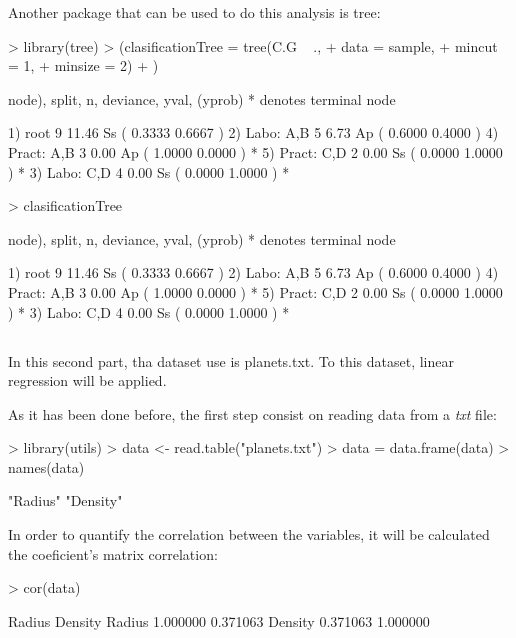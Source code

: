 \documentclass[a4paper]{article}
\begin{document}
Another package that can be used to do this analysis is tree:
\begin{Schunk}
\begin{Sinput}
> library(tree)
> (clasificationTree = tree(C.G ~ .,
+                           data = sample,
+                           mincut = 1,
+                           minsize = 2)
+ )
\end{Sinput}
\begin{Soutput}
node), split, n, deviance, yval, (yprob)
      * denotes terminal node

1) root 9 11.46 Ss ( 0.3333 0.6667 )  
  2) Labo: A,B 5  6.73 Ap ( 0.6000 0.4000 )  
    4) Pract: A,B 3  0.00 Ap ( 1.0000 0.0000 ) *
    5) Pract: C,D 2  0.00 Ss ( 0.0000 1.0000 ) *
  3) Labo: C,D 4  0.00 Ss ( 0.0000 1.0000 ) *
\end{Soutput}
\begin{Sinput}
> clasificationTree
\end{Sinput}
\begin{Soutput}
node), split, n, deviance, yval, (yprob)
      * denotes terminal node

1) root 9 11.46 Ss ( 0.3333 0.6667 )  
  2) Labo: A,B 5  6.73 Ap ( 0.6000 0.4000 )  
    4) Pract: A,B 3  0.00 Ap ( 1.0000 0.0000 ) *
    5) Pract: C,D 2  0.00 Ss ( 0.0000 1.0000 ) *
  3) Labo: C,D 4  0.00 Ss ( 0.0000 1.0000 ) *
\end{Soutput}
\end{Schunk}
  \subsection{} In this second part, tha dataset use is planets.txt. To this dataset, linear regression will be applied.
  
As it has been done before, the first step consist on reading data from a \textit{txt} file:
 
\begin{Schunk}
\begin{Sinput}
> library(utils)
> data <- read.table("planets.txt")
> data = data.frame(data)
> names(data)
\end{Sinput}
\begin{Soutput}
[1] "Radius"  "Density"
\end{Soutput}
\end{Schunk}

In order to quantify the correlation between the variables, it will be calculated the coeficient's matrix correlation:

\begin{Schunk}
\begin{Sinput}
> cor(data)
\end{Sinput}
\begin{Soutput}
          Radius  Density
Radius  1.000000 0.371063
Density 0.371063 1.000000
\end{Soutput}
\end{Schunk}
\end{document}
